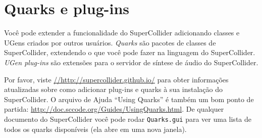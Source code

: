 \section{Quarks e plug-ins}

Você pode extender a funcionalidade do SuperCollider adicionando classes e UGens criados por outros usuários. \emph{Quarks} são pacotes de classes de SuperCollider, extendendo o que você pode fazer na linguagem do SuperCollider. \emph{UGen plug-ins} são extensões para o servidor de síntese de áudio do SuperCollider.

Por favor, viste \url{//http://supercollider.github.io/} para obter informações atualizadas sobre como adicionar plug-ins e quarks à sua instalação do SuperCollider. O arquivo de Ajuda “Using Quarks” é também um bom ponto de partida: \url{http://doc.sccode.org/Guides/UsingQuarks.html}. De qualquer documento do SuperCollider você pode rodar \texttt{Quarks.gui} para ver uma lista de todos os quarks disponíveis (ela abre em uma nova janela).
